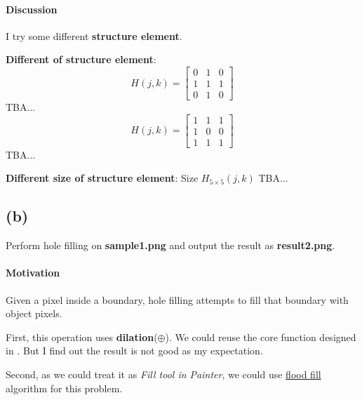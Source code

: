 \paragraph{Discussion}
I try some different \textbf{structure element}.

\textbf{Different of structure element}:
\[
    H(j, k) = \begin{bmatrix}
	0 & 1 & 0\\
	1 & 1 & 1\\
	0 & 1 & 0
    \end{bmatrix}
\]
\alert{TBA}...
\[
    H(j, k) = \begin{bmatrix}
	1 & 1 & 1\\
	1 & 0 & 0\\
	1 & 1 & 1
    \end{bmatrix}
\]
\alert{TBA}...

\textbf{Different size of structure element}:
Size \(H_{5 \times 5}(j, k)\)
\alert{TBA}...

\subsection{(b)}\label{1_b}
Perform hole filling on \textbf{sample1.png} and output the result as \textbf{result2.png}.

\paragraph{Motivation}
Given a pixel inside a boundary, hole filling attempts to fill that boundary with object pixels.

First, this operation uses \textbf{dilation}(\(\oplus \)). We could reuse the core function designed in . But I find out the result is not good as my expectation.

Second, as we could treat it as \textit{Fill tool in Painter}, we could use \href{https://leetcode.com/problems/flood-fill}{flood fill} algorithm for this problem.

